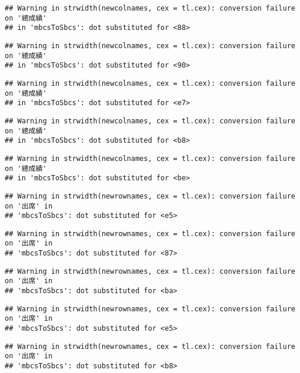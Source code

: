 \documentclass[
]{book}
\begin{document}
\begin{verbatim}
## Warning in strwidth(newcolnames, cex = tl.cex): conversion failure on '總成績'
## in 'mbcsToSbcs': dot substituted for <88>
\end{verbatim}

\begin{verbatim}
## Warning in strwidth(newcolnames, cex = tl.cex): conversion failure on '總成績'
## in 'mbcsToSbcs': dot substituted for <90>
\end{verbatim}

\begin{verbatim}
## Warning in strwidth(newcolnames, cex = tl.cex): conversion failure on '總成績'
## in 'mbcsToSbcs': dot substituted for <e7>
\end{verbatim}

\begin{verbatim}
## Warning in strwidth(newcolnames, cex = tl.cex): conversion failure on '總成績'
## in 'mbcsToSbcs': dot substituted for <b8>
\end{verbatim}

\begin{verbatim}
## Warning in strwidth(newcolnames, cex = tl.cex): conversion failure on '總成績'
## in 'mbcsToSbcs': dot substituted for <be>
\end{verbatim}

\begin{verbatim}
## Warning in strwidth(newrownames, cex = tl.cex): conversion failure on '出席' in
## 'mbcsToSbcs': dot substituted for <e5>
\end{verbatim}

\begin{verbatim}
## Warning in strwidth(newrownames, cex = tl.cex): conversion failure on '出席' in
## 'mbcsToSbcs': dot substituted for <87>
\end{verbatim}

\begin{verbatim}
## Warning in strwidth(newrownames, cex = tl.cex): conversion failure on '出席' in
## 'mbcsToSbcs': dot substituted for <ba>
\end{verbatim}

\begin{verbatim}
## Warning in strwidth(newrownames, cex = tl.cex): conversion failure on '出席' in
## 'mbcsToSbcs': dot substituted for <e5>
\end{verbatim}

\begin{verbatim}
## Warning in strwidth(newrownames, cex = tl.cex): conversion failure on '出席' in
## 'mbcsToSbcs': dot substituted for <b8>
\end{verbatim}
\end{document}
